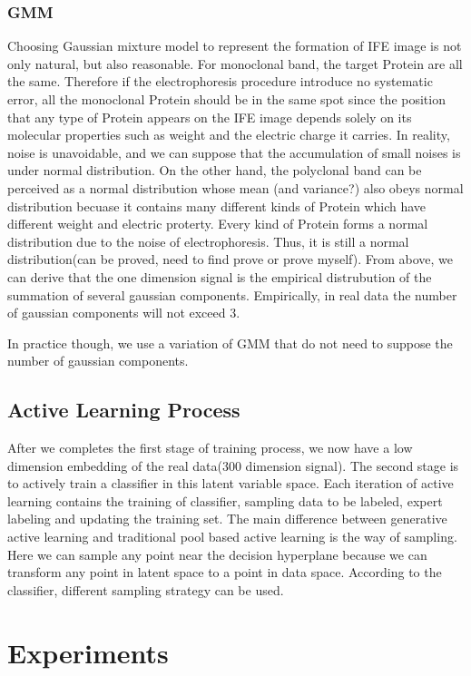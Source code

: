 \documentclass[10pt,twocolumn,letterpaper]{article}
\begin{document}
\subsubsection{GMM}
Choosing Gaussian mixture model to represent the formation of IFE image is not only natural, but also reasonable. For monoclonal band, the target Protein are all the same. Therefore if the electrophoresis procedure introduce no systematic error, all the monoclonal Protein should be in the same spot since the position that any type of Protein appears on the IFE image depends solely on its molecular properties such as weight and the electric charge it carries. In reality, noise is unavoidable, and we can suppose that the accumulation of small noises is under normal distribution. On the other hand, the polyclonal band can be perceived as a normal distribution whose mean (and variance?) also obeys normal distribution becuase it contains many different kinds of Protein which have different weight and electric proterty. Every kind of Protein forms a normal distribution due to the noise of electrophoresis. Thus, it is still a normal distribution(can be proved, need to find prove or prove myself). From above, we can derive that the one dimension signal is the empirical distrubution of the summation of several gaussian components. Empirically, in real data the number of gaussian components will not exceed 3.

In practice though, we use a variation of GMM that do not need to suppose the number of gaussian components.


\subsection{Active Learning Process}
After we completes the first stage of training process, we now have a low dimension embedding of the real data(300 dimension signal). The second stage is to actively train a classifier in this latent variable space. Each iteration of active learning contains the training of classifier, sampling data to be labeled, expert labeling and updating the training set. The main difference between generative active learning and traditional pool based active learning is the way of sampling. Here we can sample any point near the decision hyperplane because we can transform any point in latent space to a point in data space. According to the classifier, different sampling strategy can be used.

\section{Experiments}
\end{document}
